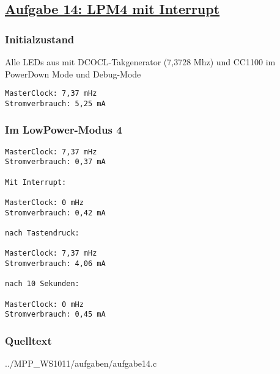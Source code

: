 \subsection
{\href{http://cst.mi.fu-berlin.de/intern/19606-P-MPP/Aufgaben/040501.html}
{Aufgabe 14: LPM4 mit Interrupt}}

\subsubsection*{Initialzustand}
Alle LEDs aus mit DCOCL-Takgenerator (7,3728 Mhz) und CC1100 im PowerDown Mode und Debug-Mode

\begin{verbatim}
MasterClock: 7,37 mHz
Stromverbrauch: 5,25 mA
\end{verbatim}

\subsubsection*{Im LowPower-Modus 4}
\begin{verbatim}
MasterClock: 7,37 mHz
Stromverbrauch: 0,37 mA

Mit Interrupt:

MasterClock: 0 mHz
Stromverbrauch: 0,42 mA

nach Tastendruck:

MasterClock: 7,37 mHz
Stromverbrauch: 4,06 mA

nach 10 Sekunden:

MasterClock: 0 mHz
Stromverbrauch: 0,45 mA
\end{verbatim}

\subsubsection*{Quelltext}

{../MPP_WS1011/aufgaben/aufgabe14.c}
